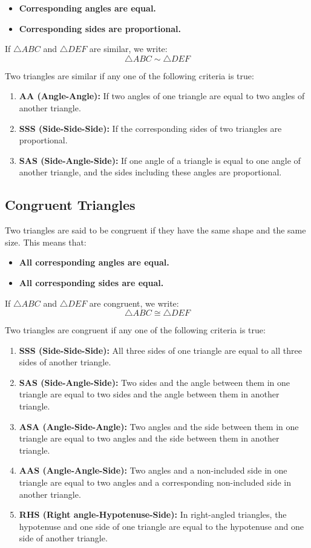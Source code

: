 \documentclass[12pt,a4paper]{article}
\begin{document}
\begin{itemize}
    \item \textbf{Corresponding angles are equal.}
    \item \textbf{Corresponding sides are proportional.}
\end{itemize}

If \(\triangle ABC\) and \(\triangle DEF\) are similar, we write:
\[
\triangle ABC \sim \triangle DEF
\]

Two triangles are similar if any one of the following criteria is true:
\begin{enumerate}
    \item \textbf{AA (Angle-Angle):} If two angles of one triangle are equal to two angles of another triangle.
    \item \textbf{SSS (Side-Side-Side):} If the corresponding sides of two triangles are proportional.
    \item \textbf{SAS (Side-Angle-Side):} If one angle of a triangle is equal to one angle of another triangle, and the sides including these angles are proportional.
\end{enumerate}

\newpage

\subsection*{Congruent Triangles}
Two triangles are said to be congruent if they have the same shape and the same size. This means that:

\begin{itemize}
    \item \textbf{All corresponding angles are equal.}
    \item \textbf{All corresponding sides are equal.}
\end{itemize}

If \(\triangle ABC\) and \(\triangle DEF\) are congruent, we write:
\[
\triangle ABC \cong \triangle DEF
\]

Two triangles are congruent if any one of the following criteria is true:
\begin{enumerate}
    \item \textbf{SSS (Side-Side-Side):} All three sides of one triangle are equal to all three sides of another triangle.
    \item \textbf{SAS (Side-Angle-Side):} Two sides and the angle between them in one triangle are equal to two sides and the angle between them in another triangle.
    \item \textbf{ASA (Angle-Side-Angle):} Two angles and the side between them in one triangle are equal to two angles and the side between them in another triangle.
    \item \textbf{AAS (Angle-Angle-Side):} Two angles and a non-included side in one triangle are equal to two angles and a corresponding non-included side in another triangle.
    \item \textbf{RHS (Right angle-Hypotenuse-Side):} In right-angled triangles, the hypotenuse and one side of one triangle are equal to the hypotenuse and one side of another triangle.
\end{enumerate}
\end{document}
